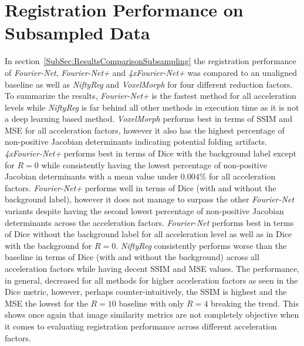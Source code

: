 \section{Registration Performance on Subsampled Data} \label{SubSubSec:DiscussionComparisonSubsampling}
In section~\ref{SubSec:ResultsComparisonSubsampling} the registration performance of \emph{Fourier-Net}, \emph{Fourier-Net+} and \emph{4xFourier-Net+} was compared to an unaligned baseline as well as \emph{NiftyReg} and \emph{VoxelMorph} for four different reduction factors. To summarize the results, \emph{Fourier-Net+} is the fastest method for all acceleration levels while \emph{NiftyReg} is far behind all other methods in execution time as it is not a deep learning based method. \emph{VoxelMorph} performs best in terms of SSIM and MSE for all acceleration factors, however it also has the highest percentage of non-positive Jacobian determinants indicating potential folding artifacts. \emph{4xFourier-Net+} performs best in terms of Dice with the background label except for $R=0$ while consistently having the lowest percentage of non-positive Jacobian determinants with a mean value under $0.004\%$ for all acceleration factors. \emph{Fourier-Net+} performs well in terms of Dice (with and without the background label), however it does not manage to surpass the other \emph{Fourier-Net} variants despite having the second lowest percentage of non-positive Jacobian determinants across the acceleration factors. \emph{Fourier-Net} performs best in terms of Dice without the background label for all acceleration level as well as in Dice with the background for $R=0$. \emph{NiftyReg} consistently performs worse than the baseline in terms of Dice (with and without the background) across all acceleration factors while having decent SSIM and MSE values. The performance, in general, decreased for all methods for higher acceleration factors as seen in the Dice metric, however, perhaps counter-intuitively, the SSIM is highest and the MSE the lowest for the $R=10$ baseline with only $R=4$ breaking the trend. This shows once again that image similarity metrics are not completely objective when it comes to evaluating registration performance across different acceleration factors.

